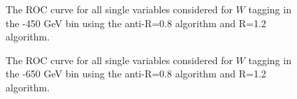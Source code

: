 \begin{figure}
\begin{center}
\caption{The ROC curve for all single variables considered for $W$
tagging in the -450 GeV bin using the anti-\kT R=0.8 algorithm and R=1.2 algorithm.}
\label{fig:pt300_single}
\end{center}
\end{figure}


\begin{figure}
\begin{center}
\caption{The ROC curve for all single variables considered for $W$
tagging in the -650 GeV bin using the anti-\kT R=0.8 algorithm and R=1.2 algorithm.}
\label{fig:pt500_single}
\end{center}
\end{figure}

